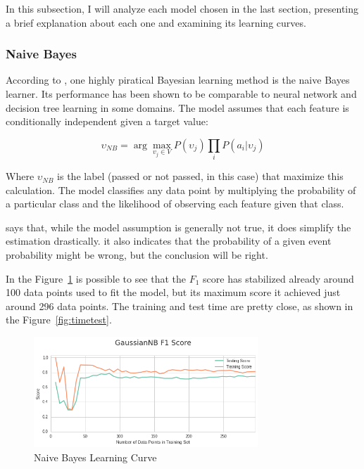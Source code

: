 \documentclass[a4paper]{article}
\begin{document}
In this subsection, I will analyze each model chosen in the last section, presenting a brief explanation about each one and examining its learning curves.

\subsubsection{Naive Bayes}
According to \cite{Mitchell}, one highly piratical Bayesian learning method is the naive Bayes learner. Its performance has been shown to be comparable to neural network and decision tree learning in some domains. The model assumes that each feature is conditionally independent given a target value:

$$\upsilon_{NB} = \arg\max_{v_j \in V}P(\upsilon_j) \prod_i P(a_i | \upsilon_j) $$

Where $\upsilon_{NB}$ is the label (passed or not passed, in this case) that maximize this calculation. The model classifies any data point by multiplying the probability of a particular class and the likelihood of observing each feature given that class.

\cite{Hastie_2009} says that, while the model assumption is generally not true, it does simplify the estimation drastically. it also indicates that the probability of a given event probability might be wrong, but the conclusion will be right.

In the Figure~\ref{fig:gaussianNB} is possible to see that the $F_1$ score has stabilized already around 100 data points used to fit the model, but its maximum score it achieved just around 296 data points. The training and test time are pretty close, as shown in the Figure~\ref{fig:timetest}.

\begin{figure}[ht!]
\centering
\includegraphics[width=0.75\textwidth]{figures/guassianNB.png}
\caption{\label{fig:gaussianNB}Naive Bayes Learning Curve}
\end{figure}
\end{document}

